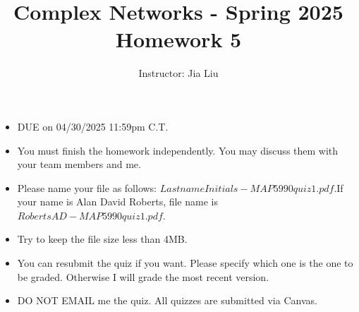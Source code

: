 \documentclass{amsart}
\theoremstyle{definition}
\theoremstyle{remark}
\numberwithin{equation}{section}
\begin{document}
\title{Complex Networks  - Spring 2025\\{\bf Homework 5}}%
\author{Instructor: Jia Liu}%
\date{}


\maketitle
\begin{itemize}
\item DUE on  04/30/2025 11:59pm C.T.
\item You must finish the homework independently. You may discuss them with your team members and me. 
\item Please name your file as follows: $LastnameInitials-MAP5990quiz1.pdf$.If your name is Alan David Roberts, file name is $RobertsAD-MAP5990quiz1.pdf$.
\item Try to keep the file size less than 4MB.
\item You can resubmit the quiz if you want. Please specify which one is the one to be graded. Otherwise I will grade the most recent version.
\item DO NOT EMAIL me the quiz. All quizzes are submitted via Canvas.
\end{itemize}
\end{document}
